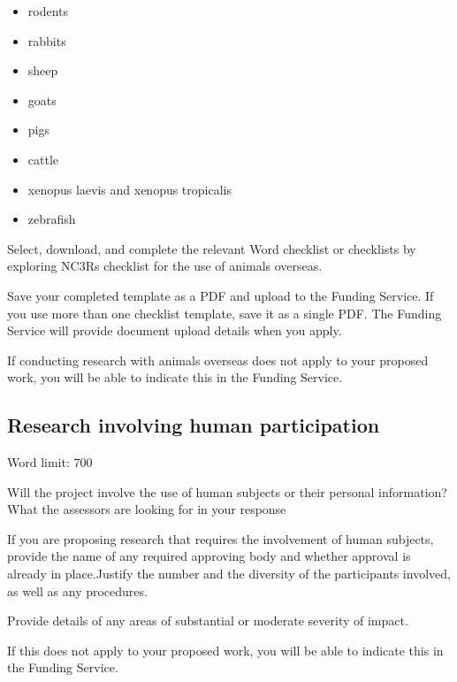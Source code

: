 \documentclass[12pt]{article}
\newenvironment{instruction}{\par\color{red}}{\par}
\begin{document}
\begin{instruction}
\begin{itemize}
	\item rodents

	\item rabbits

	\item sheep

	\item goats

	\item pigs

	\item cattle

	\item xenopus laevis and xenopus tropicalis

	\item zebrafish

\end{itemize}

Select, download, and complete the relevant Word checklist or checklists by
exploring NC3Rs checklist for the use of animals overseas.

Save your completed template as a PDF and upload to the Funding Service. If
you use more than one checklist template, save it as a single PDF.
The Funding Service will provide document upload details when you apply.

If conducting research with animals overseas does not apply to your proposed
work, you will be able to indicate this in the Funding Service.

\end{instruction}

\pagebreak
\subsection{Research involving human participation}

\begin{instruction}

Word limit: 700

Will the project involve the use of human subjects or their personal information?
What the assessors are looking for in your response

If you are proposing research that requires the involvement of human subjects,
provide the name of any required approving body and whether approval is
already in place.Justify the number and the diversity of the participants involved, as well as any
procedures.

Provide details of any areas of substantial or moderate severity of impact.

If this does not apply to your proposed work, you will be able to indicate this in
the Funding Service.

\end{instruction}
\end{document}
